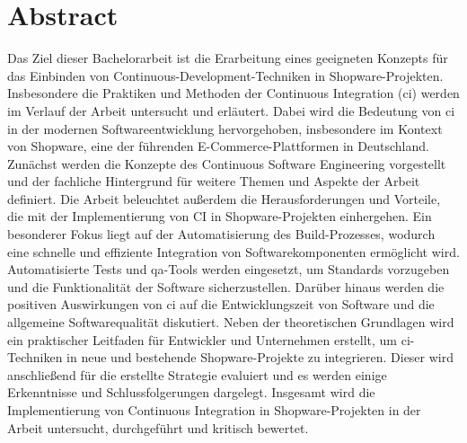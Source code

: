 
\section*{Abstract} \label{sec:00-abstract}

Das Ziel dieser Bachelorarbeit ist die Erarbeitung eines geeigneten Konzepts für das Einbinden von
Continuous-Development-Techniken in Shopware-Projekten.
Insbesondere die Praktiken und Methoden der Continuous Integration (\acrshort{ci}) werden im Verlauf der Arbeit
untersucht und erläutert.
Dabei wird die Bedeutung von \acrshort{ci} in der modernen Softwareentwicklung hervorgehoben, insbesondere im Kontext
von Shopware, eine der führenden E-Commerce-Plattformen in Deutschland.
Zunächst werden die Konzepte des Continuous Software Engineering vorgestellt und der fachliche Hintergrund für
weitere Themen und Aspekte der Arbeit definiert.
Die Arbeit beleuchtet außerdem die Herausforderungen und Vorteile, die mit der Implementierung von CI in
Shopware-Projekten einhergehen.
Ein besonderer Fokus liegt auf der Automatisierung des Build-Prozesses, wodurch eine schnelle und effiziente
Integration von Softwarekomponenten ermöglicht wird.
Automatisierte Tests und \acrshort{qa}-Tools werden eingesetzt, um Standards vorzugeben und die Funktionalität der
Software sicherzustellen.
Darüber hinaus werden die positiven Auswirkungen von \acrshort{ci} auf die Entwicklungszeit von Software und die
allgemeine Softwarequalität diskutiert.
Neben der theoretischen Grundlagen wird ein praktischer Leitfaden für Entwickler und Unternehmen erstellt, um
\acrshort{ci}-Techniken in neue und bestehende Shopware-Projekte zu integrieren.
Dieser wird anschließend für die erstellte Strategie evaluiert und es werden einige Erkenntnisse und Schlussfolgerungen
dargelegt.
Insgesamt wird die Implementierung von Continuous Integration in Shopware-Projekten in der Arbeit untersucht,
durchgeführt und kritisch bewertet.

\clearpage
